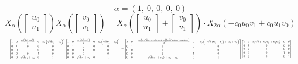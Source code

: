 \documentclass[11pt]{article}
\theoremstyle{definition}
\begin{document}
\[
\alpha = \left( 1, \  0, \  0, \  0, \  0\right)
\]
\[
X_{\alpha}\left(\left[\begin{matrix}u_{0}\\u_{1}\end{matrix}\right]\right) X_{\alpha}\left(\left[\begin{matrix}v_{0}\\v_{1}\end{matrix}\right]\right) = X_{\alpha}\left(\left[\begin{matrix}u_{0}\\u_{1}\end{matrix}\right] + \left[\begin{matrix}v_{0}\\v_{1}\end{matrix}\right]\right) \cdot X_{2\alpha}\left(- c_{0} u_{0} v_{1} + c_{0} u_{1} v_{0}\right)
\]
\[
\resizebox{\textwidth}{!}{${\left[\begin{matrix}1 & 0 & \frac{c_{0} \left(d u_{1}^{2} - u_{0}^{2}\right)}{2} & 0 & c_{0} \left(\sqrt{d} u_{1} - u_{0}\right)\\0 & 1 & 0 & 0 & 0\\0 & 0 & 1 & 0 & 0\\0 & 0 & 0 & 1 & 0\\0 & 0 & \sqrt{d} u_{1} + u_{0} & 0 & 1\end{matrix}\right]} {\left[\begin{matrix}1 & 0 & \frac{c_{0} \left(d v_{1}^{2} - v_{0}^{2}\right)}{2} & 0 & c_{0} \left(\sqrt{d} v_{1} - v_{0}\right)\\0 & 1 & 0 & 0 & 0\\0 & 0 & 1 & 0 & 0\\0 & 0 & 0 & 1 & 0\\0 & 0 & \sqrt{d} v_{1} + v_{0} & 0 & 1\end{matrix}\right]} = {\left[\begin{matrix}1 & 0 & - \frac{c_{0} \left(- \sqrt{d} \left(u_{1} + v_{1}\right) + u_{0} + v_{0}\right) \left(\sqrt{d} \left(u_{1} + v_{1}\right) + u_{0} + v_{0}\right)}{2} & 0 & - c_{0} \left(- \sqrt{d} \left(u_{1} + v_{1}\right) + u_{0} + v_{0}\right)\\0 & 1 & 0 & 0 & 0\\0 & 0 & 1 & 0 & 0\\0 & 0 & 0 & 1 & 0\\0 & 0 & \sqrt{d} \left(u_{1} + v_{1}\right) + u_{0} + v_{0} & 0 & 1\end{matrix}\right]} {\left[\begin{matrix}1 & 0 & c_{0} \sqrt{d} \left(- u_{0} v_{1} + u_{1} v_{0}\right) & 0 & 0\\0 & 1 & 0 & 0 & 0\\0 & 0 & 1 & 0 & 0\\0 & 0 & 0 & 1 & 0\\0 & 0 & 0 & 0 & 1\end{matrix}\right]}$}
\]
\end{document}
